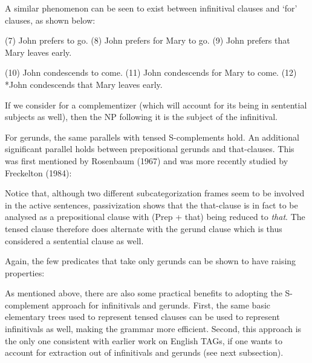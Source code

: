 A similar phenomenon can be seen to exist between infinitival clauses and `for' clauses, as shown below:

(7)	John prefers to go.
(8)	John prefers for Mary to go.
(9)	John prefers that Mary leaves early.

(10)	John condescends to come.
(11)	John condescends for Mary to come.
(12)	*John condescends that Mary leaves early.


If we consider for  a
complementizer (which will account for its being in sentential subjects as well),
 then the NP following it is the subject of the
 infinitival.


For gerunds, the same parallels with tensed S-complements hold. An additional significant parallel holds  
between prepositional gerunds and that-clauses.  This was first mentioned by Rosenbaum (1967)\nocite{ros67}
and was more recently studied by Freckelton (1984)\nocite{freck84b}:

\beginsentences
{}
\endsentences

Notice that, although two different subcategorization frames seem to be involved in the
active sentences, passivization shows that the that-clause is in fact to be analysed
 as a
prepositional clause with (Prep + that) being reduced to {\it that}. 
 The tensed clause therefore
does alternate with the gerund clause  which is thus considered a
sentential clause as well.

Again, the few predicates that take only gerunds can be shown to have raising properties:

\beginsentences
{}
\endsentences

As mentioned above, there are also some practical benefits to adopting the
 S-complement approach for infinitivals and gerunds.
First, the same basic elementary trees used to represent tensed clauses can be used to represent infinitivals 
as well, making the grammar more efficient.  Second, this approach is the only one consistent
 with earlier work on English
TAGs, if one wants to account for extraction out of infinitivals and 
gerunds (see next subsection).       

